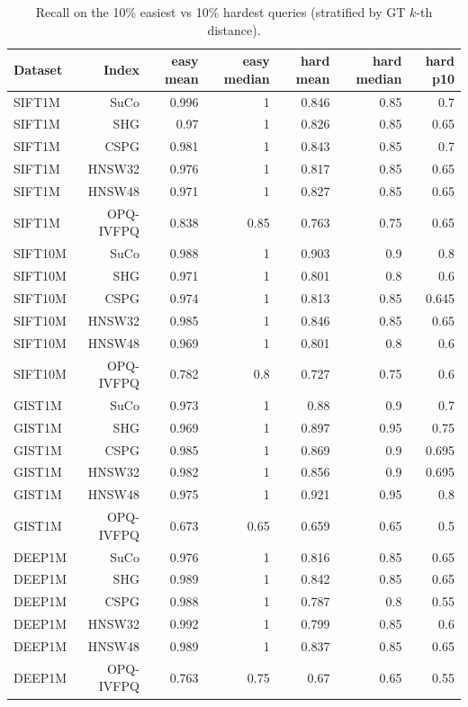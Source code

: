 \begin{table}[t]
\centering
\small
\caption{Recall on the 10\% easiest vs 10\% hardest queries (stratified by GT $k$-th distance).}
\label{tab:hard-easy}
\begin{tabular}{lrrrrrr}
\toprule
Dataset & Index & easy mean & easy median & hard mean & hard median & hard p10 \\
\midrule
SIFT1M & SuCo & 0.996 & 1 & 0.846 & 0.85 & 0.7 \\
SIFT1M & SHG & 0.97 & 1 & 0.826 & 0.85 & 0.65 \\
SIFT1M & CSPG & 0.981 & 1 & 0.843 & 0.85 & 0.7 \\
SIFT1M & HNSW32 & 0.976 & 1 & 0.817 & 0.85 & 0.65 \\
SIFT1M & HNSW48 & 0.971 & 1 & 0.827 & 0.85 & 0.65 \\
SIFT1M & OPQ-IVFPQ & 0.838 & 0.85 & 0.763 & 0.75 & 0.65 \\
SIFT10M & SuCo & 0.988 & 1 & 0.903 & 0.9 & 0.8 \\
SIFT10M & SHG & 0.971 & 1 & 0.801 & 0.8 & 0.6 \\
SIFT10M & CSPG & 0.974 & 1 & 0.813 & 0.85 & 0.645 \\
SIFT10M & HNSW32 & 0.985 & 1 & 0.846 & 0.85 & 0.65 \\
SIFT10M & HNSW48 & 0.969 & 1 & 0.801 & 0.8 & 0.6 \\
SIFT10M & OPQ-IVFPQ & 0.782 & 0.8 & 0.727 & 0.75 & 0.6 \\
GIST1M & SuCo & 0.973 & 1 & 0.88 & 0.9 & 0.7 \\
GIST1M & SHG & 0.969 & 1 & 0.897 & 0.95 & 0.75 \\
GIST1M & CSPG & 0.985 & 1 & 0.869 & 0.9 & 0.695 \\
GIST1M & HNSW32 & 0.982 & 1 & 0.856 & 0.9 & 0.695 \\
GIST1M & HNSW48 & 0.975 & 1 & 0.921 & 0.95 & 0.8 \\
GIST1M & OPQ-IVFPQ & 0.673 & 0.65 & 0.659 & 0.65 & 0.5 \\
DEEP1M & SuCo & 0.976 & 1 & 0.816 & 0.85 & 0.65 \\
DEEP1M & SHG & 0.989 & 1 & 0.842 & 0.85 & 0.65 \\
DEEP1M & CSPG & 0.988 & 1 & 0.787 & 0.8 & 0.55 \\
DEEP1M & HNSW32 & 0.992 & 1 & 0.799 & 0.85 & 0.6 \\
DEEP1M & HNSW48 & 0.989 & 1 & 0.837 & 0.85 & 0.65 \\
DEEP1M & OPQ-IVFPQ & 0.763 & 0.75 & 0.67 & 0.65 & 0.55 \\

\end{tabular}
\end{table}
